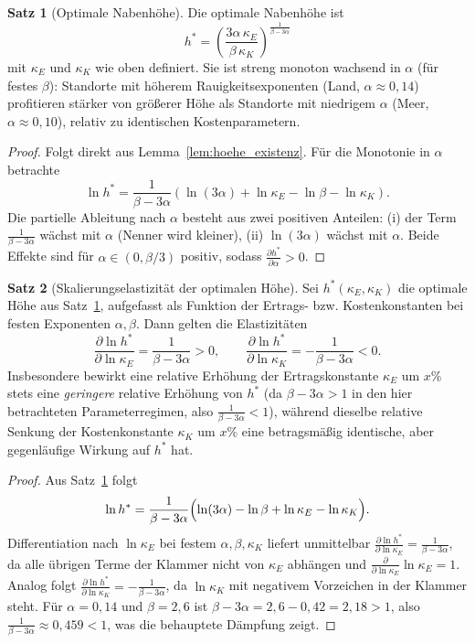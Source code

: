 ﻿\documentclass[a4paper,12pt]{article}
\theoremstyle{definition}
\newtheorem{satz}{Satz}
\begin{document}
\begin{satz}[Optimale Nabenhöhe]
\label{satz:hoehe_optimal}
Die optimale Nabenhöhe ist
\[
h^* = \left(\frac{3\alpha\,\kappa_E}{\beta\,\kappa_K}\right)^{\frac{1}{\beta-3\alpha}}
\]
mit $\kappa_E$ und $\kappa_K$ wie oben definiert. Sie ist streng monoton wachsend in $\alpha$ (für festes $\beta$): Standorte mit höherem Rauigkeitsexponenten (Land, $\alpha\approx0{,}14$) profitieren stärker von größerer Höhe als Standorte mit niedrigem $\alpha$ (Meer, $\alpha\approx0{,}10$), relativ zu identischen Kostenparametern.
\end{satz}

\begin{proof}
Folgt direkt aus Lemma~\ref{lem:hoehe_existenz}. Für die Monotonie in $\alpha$ betrachte
\[
\ln h^* = \frac{1}{\beta-3\alpha}\left(\ln(3\alpha) + \ln\kappa_E - \ln\beta - \ln\kappa_K\right).
\]
Die partielle Ableitung nach $\alpha$ besteht aus zwei positiven Anteilen: (i) der Term $\frac{1}{\beta-3\alpha}$ wächst mit $\alpha$ (Nenner wird kleiner), (ii) $\ln(3\alpha)$ wächst mit $\alpha$. Beide Effekte sind für $\alpha \in (0, \beta/3)$ positiv, sodass $\frac{\partial h^*}{\partial \alpha}>0$. \qedhere
\end{proof}

\begin{satz}[Skalierungselastizität der optimalen Höhe]
\label{satz:elastizitaet_hoehe}
Sei $h^*(\kappa_E,\kappa_K)$ die optimale Höhe aus Satz~\ref{satz:hoehe_optimal}, aufgefasst als Funktion der Ertrags- bzw. Kostenkonstanten bei festen Exponenten $\alpha,\beta$. Dann gelten die Elastizitäten
\[
\frac{\partial \ln h^*}{\partial \ln \kappa_E} = \frac{1}{\beta-3\alpha} > 0,
\qquad
\frac{\partial \ln h^*}{\partial \ln \kappa_K} = -\frac{1}{\beta-3\alpha} < 0.
\]
Insbesondere bewirkt eine relative Erhöhung der Ertragskonstante $\kappa_E$ um $x\%$ stets eine \emph{geringere} relative Erhöhung von $h^*$ (da $\beta-3\alpha>1$ in den hier betrachteten Parameterregimen, also $\frac{1}{\beta-3\alpha}<1$), während dieselbe relative Senkung der Kostenkonstante $\kappa_K$ um $x\%$ eine betragsmäßig identische, aber gegenläufige Wirkung auf $h^*$ hat.
\end{satz}

\begin{proof}
Aus Satz~\ref{satz:hoehe_optimal} folgt
\[
\ln h^* = \frac{1}{\beta-3\alpha}\Bigl(\ln(3\alpha) - \ln\beta + \ln\kappa_E - \ln\kappa_K\Bigr).
\]
Differentiation nach $\ln\kappa_E$ bei festem $\alpha,\beta,\kappa_K$ liefert unmittelbar $\frac{\partial \ln h^*}{\partial\ln\kappa_E} = \frac{1}{\beta-3\alpha}$, da alle übrigen Terme der Klammer nicht von $\kappa_E$ abhängen und $\frac{\partial}{\partial\ln\kappa_E}\ln\kappa_E=1$. Analog folgt $\frac{\partial \ln h^*}{\partial\ln\kappa_K} = -\frac{1}{\beta-3\alpha}$, da $\ln\kappa_K$ mit negativem Vorzeichen in der Klammer steht. Für $\alpha=0{,}14$ und $\beta=2{,}6$ ist $\beta-3\alpha=2{,}6-0{,}42=2{,}18>1$, also $\frac{1}{\beta-3\alpha}\approx0{,}459<1$, was die behauptete Dämpfung zeigt. \qedhere
\end{proof}
\end{document}
